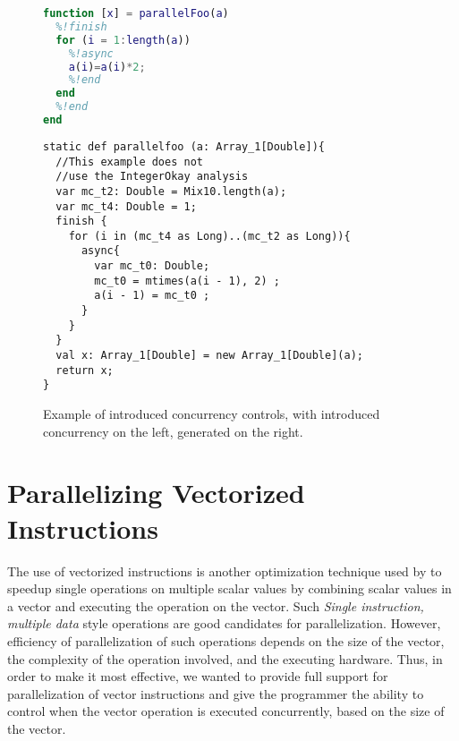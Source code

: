 \begin{figure}[htbp]
\begin{minipage}{0.3\linewidth}

\begin{lstlisting}[language=Matlab,numbers=none]       
function [x] = parallelFoo(a)    
  %!finish
  for (i = 1:length(a))
    %!async
    a(i)=a(i)*2;
    %!end	
  end
  %!end
end                                                                             
\end{lstlisting}

\end{minipage}\hfill
\begin{minipage}{0.6\linewidth}
\begin{lstlisting}[language=X10,numbers=none]                                   
static def parallelfoo (a: Array_1[Double]){
  //This example does not 
  //use the IntegerOkay analysis
  var mc_t2: Double = Mix10.length(a);
  var mc_t4: Double = 1;
  finish {
    for (i in (mc_t4 as Long)..(mc_t2 as Long)){
      async{
        var mc_t0: Double;
        mc_t0 = mtimes(a(i - 1), 2) ;
        a(i - 1) = mc_t0 ;
      }
    }
  }
  val x: Array_1[Double] = new Array_1[Double](a);
  return x;
}
\end{lstlisting}
\end{minipage}

\caption{Example of introduced concurrency controls, \matlab with
introduced concurrency on the left, generated \xten on the right.}\label{fig:concex}
\end{figure}

\section{Parallelizing Vectorized Instructions}\label{sec:parvec} 
The use of vectorized instructions is another optimization technique
used by \matlab to speedup single operations on multiple scalar values by
combining scalar values in a vector and executing the operation on the
vector.  Such \emph{Single instruction, multiple data} style operations
are good candidates for parallelization. However, efficiency of
parallelization of such operations depends on the size of the vector,
the complexity of the operation involved, and the executing hardware. Thus,
in order to make it most effective, we wanted to provide full support
for parallelization of vector instructions and give the programmer the
ability to control when the vector operation is executed concurrently,
based on the size of the vector. 

